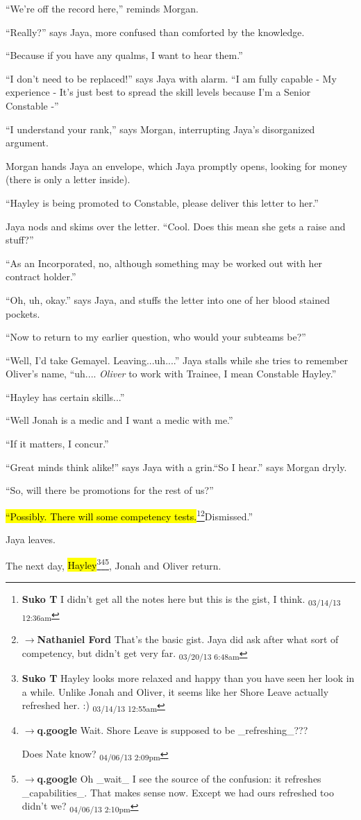 ``We're off the record here,'' reminds Morgan.

``Really?'' says Jaya, more confused than comforted by the knowledge.

``Because if you have any qualms, I want to hear them.''

``I don't need to be replaced!'' says Jaya with alarm. ``I am fully capable - My experience - It's just best to spread the skill levels because I'm a Senior Constable -''

``I understand your rank,'' says Morgan, interrupting Jaya's disorganized argument.

Morgan hands Jaya an envelope, which Jaya promptly opens, looking for money (there is only a letter inside).

``Hayley is being promoted to Constable, please deliver this letter to her.''  

Jaya nods and skims over the letter.  ``Cool.  Does this mean she gets a raise and stuff?''

``As an Incorporated, no, although something may be worked out with her contract holder.''

``Oh, uh, okay.'' says Jaya, and stuffs the letter into one of her blood stained pockets.

``Now to return to my earlier question, who would your subteams be?''

``Well, I'd take Gemayel.  Leaving...uh....'' Jaya stalls while she tries to remember Oliver's name, ``uh.... \textit{Oliver }to work with Trainee, I mean Constable Hayley.''

``Hayley has certain skills...''

``Well Jonah is a medic and I want a medic with me.''

``If it matters, I concur.''

``Great minds think alike!'' says Jaya with a grin.``So I hear.'' says Morgan dryly.

``So, will there be promotions for the rest of us?''

\hl{``Possibly. There will some competency tests.}\footnote{\textbf{Suko T }I didn't get all the notes here but this is the gist, I think. \textsubscript{03/14/13 12:36am}}\footnote{$\rightarrow$\textbf{Nathaniel Ford }That's the basic gist. Jaya did ask after what sort of competency, but didn't get very far. \textsubscript{03/20/13 6:48am}}Dismissed.''

Jaya leaves.



The next day, \hl{Hayley}\footnote{\textbf{Suko T }Hayley looks more relaxed and happy than you have seen her look in a while.  Unlike Jonah and Oliver, it seems like her Shore Leave actually refreshed her. :) \textsubscript{03/14/13 12:55am}}\footnote{$\rightarrow$\textbf{q.google }Wait.  Shore Leave is supposed to be \_refreshing\_???

Does Nate know? \textsubscript{04/06/13 2:09pm}}\footnote{$\rightarrow$\textbf{q.google }Oh \_wait\_ I see the source of the confusion: it refreshes \_capabilities\_.  That makes sense now.  Except we had ours refreshed too didn't we?
 \textsubscript{04/06/13 2:10pm}}, Jonah and Oliver return.  



